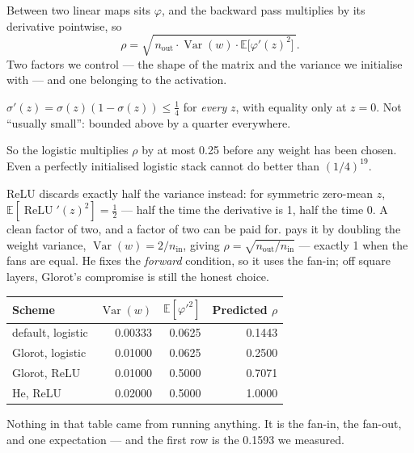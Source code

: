 \documentclass[11pt,a4paper]{article}
\begin{document}
Between two linear maps sits $\varphi$, and the backward pass multiplies by its
derivative pointwise, so
\[ \rho = \sqrt{\,n_{\text{out}}\cdot\operatorname{Var}(w)\cdot
                 \mathbb{E}\bigl[\varphi'(z)^2\bigr]\,}. \]
Two factors we control --- the shape of the matrix and the variance we
initialise with --- and one belonging to the activation.

\begin{failbox}[title={The logistic's ceiling}]
$\sigma'(z) = \sigma(z)(1-\sigma(z)) \le \tfrac14$ for \emph{every} $z$, with
equality only at $z = 0$. Not ``usually small'': bounded above by a quarter
everywhere.

So the logistic multiplies $\rho$ by at most 0.25 before any weight has been
chosen. Even a perfectly initialised logistic stack cannot do better than
$(1/4)^{19}$.
\end{failbox}

ReLU discards exactly half the variance instead: for symmetric zero-mean $z$,
$\mathbb{E}[\operatorname{ReLU}'(z)^2] = \tfrac12$ --- half the time the
derivative is 1, half the time 0. A clean factor of two, and a factor of two
can be paid for.  pays it by doubling the weight variance,
$\operatorname{Var}(w) = 2/n_{\text{in}}$, giving
$\rho = \sqrt{n_{\text{out}}/n_{\text{in}}}$ --- exactly 1 when the fans are
equal. He fixes the \emph{forward} condition, so it uses the fan-in; off square
layers, Glorot's compromise is still the honest choice.

\begin{center}
\small
\begin{tabular}{lrrr}
\toprule
\textbf{Scheme} & $\operatorname{Var}(w)$ &
$\mathbb{E}[\varphi'^2]$ & \textbf{Predicted $\rho$} \\
\midrule
default, logistic & 0.00333 & 0.0625 & 0.1443 \\
Glorot, logistic  & 0.01000 & 0.0625 & 0.2500 \\
Glorot, ReLU      & 0.01000 & 0.5000 & 0.7071 \\
He, ReLU          & 0.02000 & 0.5000 & 1.0000 \\
\bottomrule
\end{tabular}
\end{center}

Nothing in that table came from running anything. It is the fan-in, the
fan-out, and one expectation --- and the first row is the 0.1593 we measured.
\end{document}
